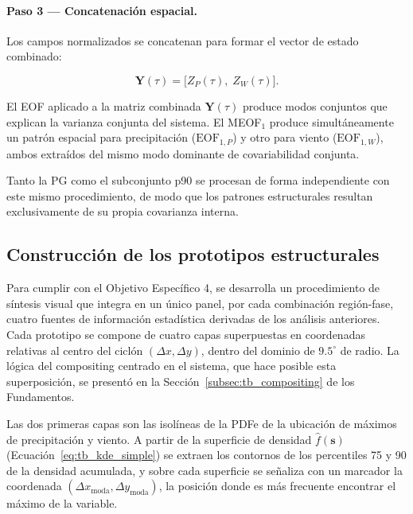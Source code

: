 \paragraph{Paso 3 — Concatenación espacial.} Los campos normalizados se concatenan para formar el vector de estado combinado:

\begin{equation}\label{eq:meof_vector}
    \mathbf{Y}(\tau) = \big[ Z_P(\tau),\; Z_W(\tau) \big].
\end{equation}

El EOF aplicado a la matriz combinada $\mathbf{Y}(\tau)$ produce modos conjuntos que explican la varianza conjunta del sistema. El MEOF$_1$ produce simultáneamente un patrón espacial para precipitación ($\text{EOF}_{1,P}$) y otro para viento ($\text{EOF}_{1,W}$), ambos extraídos del mismo modo dominante de covariabilidad conjunta.

Tanto la PG como el subconjunto p90 se procesan de forma independiente con este mismo procedimiento, de modo que los patrones estructurales resultan exclusivamente de su propia covarianza interna.

\subsection{Construcción de los prototipos estructurales}\label{subsec:prototipos}

Para cumplir con el Objetivo Específico 4, se desarrolla un procedimiento de síntesis visual que integra en un único panel, por cada combinación región-fase, cuatro fuentes de información estadística derivadas de los análisis anteriores. Cada prototipo se compone de cuatro capas superpuestas en coordenadas relativas al centro del ciclón $(\Delta x, \Delta y)$, dentro del dominio de $9.5^{\circ}$ de radio. La lógica del compositing centrado en el sistema, que hace posible esta superposición, se presentó en la Sección~\ref{subsec:tb_compositing} de los Fundamentos.

Las dos primeras capas son las isolíneas de la PDFe de la ubicación de máximos de precipitación y viento. A partir de la superficie de densidad $\hat{f}(\mathbf{s})$ (Ecuación~\ref{eq:tb_kde_simple}) se extraen los contornos de los percentiles 75 y 90 de la densidad acumulada, y sobre cada superficie se señaliza con un marcador la coordenada $(\Delta x_{\text{moda}}, \Delta y_{\text{moda}})$, la posición donde es más frecuente encontrar el máximo de la variable.

